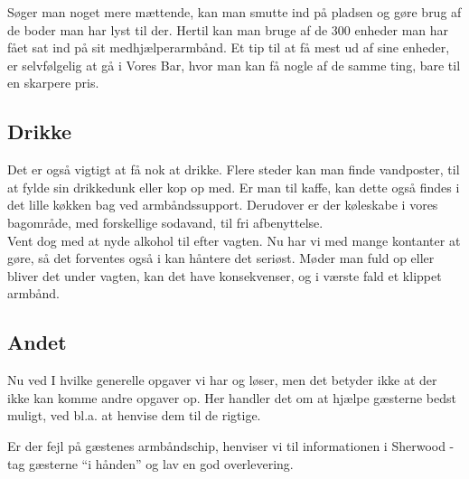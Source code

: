 Søger man noget mere mættende, kan man smutte ind på pladsen og gøre brug af de boder man har lyst til der.
Hertil kan man bruge af de 300 enheder man har fået sat ind på sit medhjælperarmbånd. Et tip til at få mest 
ud af sine enheder, er selvfølgelig at gå i Vores Bar, hvor man kan få nogle af de samme ting, bare til en 
skarpere pris.

\subsection{Drikke}

Det er også vigtigt at få nok at drikke.
Flere steder kan man finde vandposter, til at fylde sin drikkedunk eller kop op med.
Er man til kaffe, kan dette også findes i det lille køkken bag ved armbåndssupport.
Derudover er der køleskabe i vores bagområde, med forskellige sodavand, til fri 
afbenyttelse. \\

Vent dog med at nyde alkohol til efter vagten. Nu har vi med mange kontanter at gøre, 
så det forventes også i kan håntere det seriøst. 
Møder man fuld op eller bliver det under vagten, kan det have konsekvenser, og i 
værste fald et klippet armbånd.

\subsection{Andet}
\label{sec:intra:andet}

Nu ved I hvilke generelle opgaver vi har og løser, men det betyder ikke 
at der ikke kan komme andre opgaver op. Her handler det om at hjælpe gæsterne 
bedst muligt, ved bl.a. at henvise dem til de rigtige.

Er der fejl på gæstenes armbåndschip, henviser vi til informationen i Sherwood - tag gæsterne ``i hånden'' 
og lav en god overlevering.


